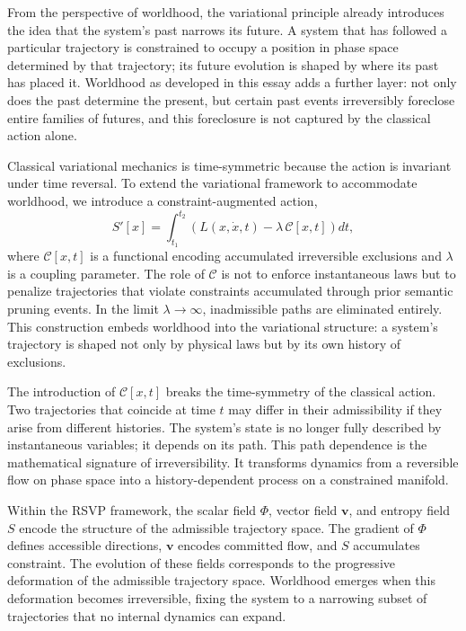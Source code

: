 \documentclass[11pt]{article}
\theoremstyle{definition}
\theoremstyle{remark}
\begin{document}
From the perspective of worldhood, the variational principle already introduces the idea
that the system's past narrows its future. A system that has followed a particular trajectory
is constrained to occupy a position in phase space determined by that trajectory; its future
evolution is shaped by where its past has placed it. Worldhood as developed in this essay
adds a further layer: not only does the past determine the present, but certain past events
irreversibly foreclose entire families of futures, and this foreclosure is not captured by
the classical action alone.

Classical variational mechanics is time-symmetric because the action is invariant under
time reversal. To extend the variational framework to accommodate worldhood, we introduce
a constraint-augmented action,
\[
S'[x] = \int_{t_1}^{t_2} \left( L(x, \dot{x}, t) - \lambda\, \mathcal{C}[x,t] \right) dt,
\]
where $\mathcal{C}[x,t]$ is a functional encoding accumulated irreversible exclusions and
$\lambda$ is a coupling parameter. The role of $\mathcal{C}$ is not to enforce instantaneous
laws but to penalize trajectories that violate constraints accumulated through prior semantic
pruning events. In the limit $\lambda \to \infty$, inadmissible paths are eliminated
entirely. This construction embeds worldhood into the variational structure: a system's
trajectory is shaped not only by physical laws but by its own history of exclusions.

The introduction of $\mathcal{C}[x,t]$ breaks the time-symmetry of the classical action.
Two trajectories that coincide at time $t$ may differ in their admissibility if they arise
from different histories. The system's state is no longer fully described by instantaneous
variables; it depends on its path. This path dependence is the mathematical signature of
irreversibility. It transforms dynamics from a reversible flow on phase space into a
history-dependent process on a constrained manifold.

Within the RSVP framework, the scalar field $\Phi$, vector field $\mathbf{v}$, and entropy
field $S$ encode the structure of the admissible trajectory space. The gradient of $\Phi$
defines accessible directions, $\mathbf{v}$ encodes committed flow, and $S$ accumulates
constraint. The evolution of these fields corresponds to the progressive deformation of the
admissible trajectory space. Worldhood emerges when this deformation becomes irreversible,
fixing the system to a narrowing subset of trajectories that no internal dynamics can expand.
\end{document}
